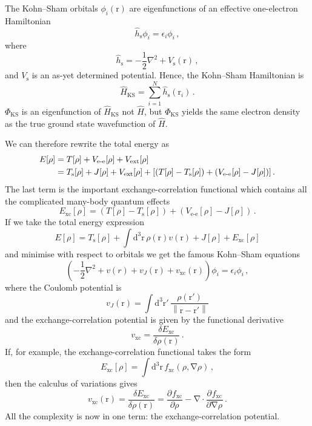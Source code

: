 \documentclass{article}
\theoremstyle{plain}\theoremheaderfont{\normalfont\itshape}\theorembodyfont{\rmfamily}\theoremseparator{.}\newtheorem*{rem}{Remark}\newtheorem*{ex}{Example}\newtheorem*{proof}{Proof}\newtheorem*{altp}{Alternative proof}
\theoremstyle{plain}\theoremheaderfont{\normalfont\bfseries}\theorembodyfont{\rmfamily}\theoremseparator{.}\newtheorem{thm}{Theorem}[section]\newtheorem{lem}[thm]{Lemma}\newtheorem{prop}[thm]{Proposition}\newtheorem*{cor}{Corollary}\newtheorem{defn}[thm]{Definition}\newtheorem{clm}[thm]{Claim}\newtheorem{clminproof}{Claim}
\theoremstyle{break}\theoremheaderfont{\normalfont\itshape}\theorembodyfont{\rmfamily}\theoremseparator{.\medskip}\newtheorem*{proofskip}{Proof}\newtheorem*{exs}{Examples}\newtheorem*{rems}{Remarks}
\theoremstyle{break}\theoremheaderfont{\normalfont\bfseries}\theorembodyfont{\rmfamily}\theoremseparator{.\medskip}\newtheorem{lemskip}[thm]{Lemma}\newtheorem{defnskip}[thm]{Definition}\newtheorem{propskip}[thm]{Proposition}\newtheorem{thmskip}[thm]{Theorem}
\numberwithin{equation}{section}
\newcommand{\dd}[2][]{\mathrm{d}^{#1} #2\,}
\newcommand{\pdv}[3][]{\frac{\partial^{#1} #2}{{\partial #3}^{#1}}}
\newcommand{\vb}[1]{\bm{\mathrm{#1}}}
\newcommand{\norm}[1]{\left\| #1 \right\|}
\newcommand{\grad}{\vb{\nabla}}
\renewcommand{\div}{\vb{\nabla}\cdot}
\newcommand{\laplacian}{\nabla^2}
\newcommand{\ext}{_{\text{ext}}}
\newcommand{\ee}{_{\text{e-e}}}
\newcommand{\s}{_{\text{s}}}
\newcommand{\xc}{_{\text{xc}}}
\begin{document}
    The Kohn--Sham orbitals \(\phi_i(\vb{r})\) are eigenfunctions of an effective one-electron Hamiltonian
    \begin{equation}
        \hat{h}\s\phi_i=\epsilon_i\phi_i\,,
    \end{equation}
    where
    \begin{equation}
        \hat{h}\s=-\frac{1}{2}\laplacian+V\s(\vb{r})\,,
    \end{equation}
    and \(V\s\) is an as-yet determined potential. Hence, the Kohn--Sham Hamiltonian is
    \begin{equation}
        \hat{H}_{\text{KS}}=\sum_{i=1}^{N}\hat{h}\s(\vb{r}_i)\,.
    \end{equation}
    \(\Phi_{\text{KS}}\) is an eigenfunction of \(\hat{H}_{\text{KS}}\) not \(\hat{H}\), but \(\Phi_{\text{KS}}\) yields the same electron density as the true ground state wavefunction of \(\hat{H}\).
    
    We can therefore rewrite the total energy as
    \begin{align}
        E[\rho]&=T[\rho]+V\ee[\rho]+V\ext[\rho]\notag\\
        &=T\s[\rho]+J[\rho]+V\ext[\rho]+[(T[\rho]-T\s[\rho])+(V\ee[\rho]-J[\rho])]\,.
    \end{align}
    The last term is the important exchange-correlation functional which contains all the complicated many-body quantum effects
    \begin{equation}
        E\xc[\rho]=(T[\rho]-T\s[\rho])+(V\ee[\rho]-J[\rho])\,.
    \end{equation}
    If we take the total energy expression
    \begin{equation}
        E[\rho]=T\s[\rho]+\int\dd[3]{\vb{r}}\rho(\vb{r})v(\vb{r})+J[\rho]+E\xc[\rho]
    \end{equation}
    and minimise with respect to orbitals we get the famous Kohn--Sham equations
    \begin{equation}
        \left(-\frac{1}{2}\laplacian+v(r)+v_{J}(\vb{r})+v\xc(\vb{r})\right)\phi_i=\epsilon_i\phi_i\,,
    \end{equation}
    where the Coulomb potential is
    \begin{equation}
        v_{J}(\vb{r})=\int\dd[3]{\vb{r}'}\frac{\rho(\vb{r}')}{\norm{\vb{r}-\vb{r}'}}
    \end{equation}
    and the exchange-correlation potential is given by the functional derivative
    \begin{equation}
        v\xc=\frac{\delta E\xc}{\delta\rho(\vb{r})}\,.
    \end{equation}
    If, for example, the exchange-correlation functional takes the form
    \begin{equation}
        E\xc[\rho]=\int\dd[3]{\vb{r}}f\xc(\rho,\grad\rho)\,,
    \end{equation}
    then the calculus of variations gives
    \begin{equation}
        v\xc(\vb{r})=\frac{\delta E\xc}{\delta\rho(\vb{r})}=\pdv{f\xc}{\rho}-\div\pdv{f\xc}{\grad\rho}\,.
    \end{equation}
    All the complexity is now in one term: the exchange-correlation potential.
\end{document}
